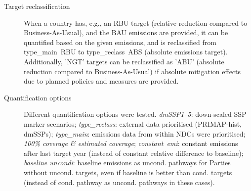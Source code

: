 \documentclass[12pt]{article}
\begin{document}
\begin{description}
 \item [Target reclassification] When a country has, e.g., an RBU target (relative reduction compared to Business-As-Usual), and the BAU emissions are provided, it can be quantified based on the given emissions, and is reclassified from type\_main~RBU to type\_reclass~ABS (absolute emissions target).
 Additionally, 'NGT' targets can be reclassified as 'ABU' (absolute reduction compared to Business-As-Usual) if absolute mitigation effects due to planned policies and measures are provided.
 \item [Quantification options] Different quantification options were tested. \newline
 \textit{dmSSP1--5}: down-scaled SSP marker scenarios; \newline
 \textit{type\_reclass}: external data prioritised (PRIMAP-hist, dmSSPs); \newline
 \textit{type\_main}: emissions data from within NDCs were prioritised; \newline
 \textit{100\% coverage \& estimated coverage}; \newline
 \textit{constant~emi}: constant emissions after last target year (instead of constant relative difference to baseline); \newline
 \textit{baseline uncondi}: baseline emissions as uncond. pathways for Parties without uncond. targets, even if baseline is better than cond. targets (instead of cond. pathway as uncond. pathways in these cases).
 \end{description}
\end{document}
